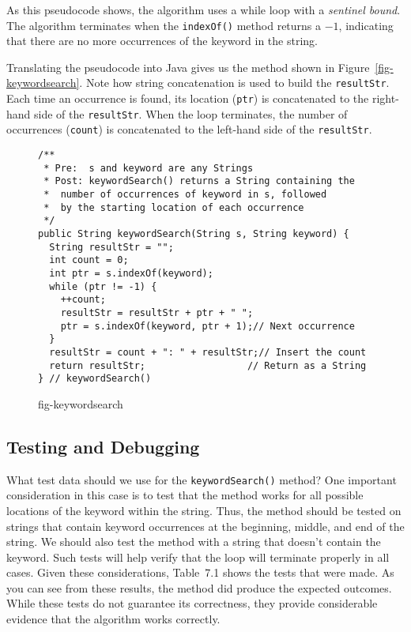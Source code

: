 \noindent As this pseudocode shows, the algorithm uses a while loop
with a {\it sentinel bound}.  The algorithm terminates when the
{\tt indexOf()} method returns a $-1$, indicating that there are no more
occurrences of the keyword in the string.

Translating the pseudocode into Java gives us the method shown in
Figure~\ref{fig-keywordsearch}.  Note how string concatenation is used
to build the \mbox{\tt resultStr}. Each time an occurrence is found, its
location ({\tt ptr}) is concatenated to the right-hand side of the
{\tt resultStr}.  When the loop terminates, the number of occurrences
({\tt count}) is concatenated to the left-hand side of the
{\tt resultStr}.

\begin{figure}[h]
\jjjprogstart
\begin{jjjlisting}
\begin{lstlisting}
/**
 * Pre:  s and keyword are any Strings
 * Post: keywordSearch() returns a String containing the
 *  number of occurrences of keyword in s, followed
 *  by the starting location of each occurrence
 */
public String keywordSearch(String s, String keyword) {
  String resultStr = "";
  int count = 0;
  int ptr = s.indexOf(keyword);
  while (ptr != -1) {
    ++count;
    resultStr = resultStr + ptr + " ";
    ptr = s.indexOf(keyword, ptr + 1);// Next occurrence
  }
  resultStr = count + ": " + resultStr;// Insert the count
  return resultStr;                  // Return as a String
} // keywordSearch()
\end{lstlisting}
\end{jjjlisting}
{fig-keywordsearch}
\end{figure}

\subsection*{Testing and Debugging}
\noindent What test data should we use for the {\tt keywordSearch()} method?
  One important consideration
in this case is to test that the method works for all possible
locations of the keyword within the string.  Thus, the method should
be tested on strings that contain keyword occurrences at the
beginning, middle, and end of the string.  We should also test the
method with a string that doesn't contain the keyword.  Such tests
will help verify that the loop will terminate properly in all cases.
Given these considerations, Table~7.1 shows the tests that were made.
As you can see from these results, the method did produce the expected
outcomes.  While these tests do not guarantee its correctness, they
provide considerable evidence that the algorithm works correctly.


